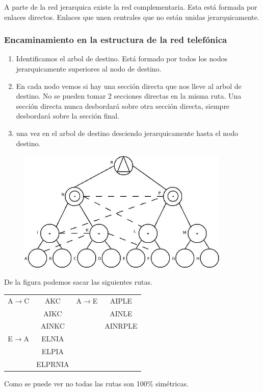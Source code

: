 A parte de la red jerarquica existe la red complementaria. Esta está formada por enlaces directos. Enlaces que unen centrales que no están unidas jerarquicamente.\\
\subsubsection{Encaminamiento en la estructura de la red telefónica}
\begin{enumerate}
\item Identificamos el arbol de destino. Está formado por todos los nodos jerarquicamente superiores al nodo de destino.
\item En cada nodo vemos si hay una sección directa que nos lleve al arbol de destino. No se pueden tomar 2 secciones directas en la misma ruta. Una sección directa nunca desbordará sobre otra sección directa, siempre desbordará sobre la sección final.
\item una vez en el arbol de destino desciendo jerarquicamente hasta el nodo destino.
\end{enumerate}
\begin{example}
\begin{figure}[H]
\centering
\includegraphics[width=0.9\textwidth]{Imagen/ejemploredtelefonica.jpg}
\label{}
\end{figure}
De la figura podemos sacar las siguientes rutas.\\
\begin{center}
\begin{tabular}{c c c c}
A$\to$C & AKC  		& A$\to$E 	& AIPLE 	\\
 		& AIKC 		&			& AINLE		\\
 		& AINKC		&			& AINRPLE	\\
E$\to$A & ELNIA  	& 		 	& 		 	\\
 		& ELPIA 	&			& 			\\
 		& ELPRNIA	&			& 			\\
\end{tabular}
\end{center}
Como se puede ver no todas las rutas son 100\% simétricas.
\end{example}
